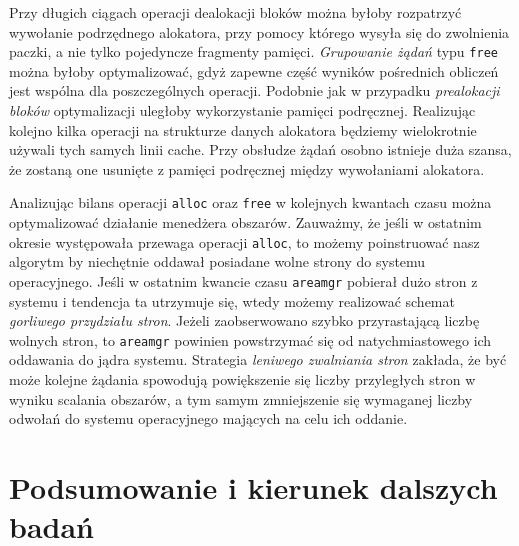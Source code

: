 \documentclass[12pt,a4paper,titlepage,twoside]{mwart}
\begin{document}
Przy długich ciągach operacji dealokacji bloków można byłoby rozpatrzyć
wywołanie podrzędnego alokatora, przy pomocy którego wysyła się do zwolnienia
paczki, a nie tylko pojedyncze fragmenty pamięci. \textit{Grupowanie żądań}
typu \texttt{free} można byłoby optymalizować, gdyż zapewne część wyników
pośrednich obliczeń jest wspólna dla poszczególnych operacji. Podobnie jak w
przypadku \textit{prealokacji bloków} optymalizacji uległoby wykorzystanie
pamięci podręcznej. Realizując kolejno kilka operacji na strukturze danych
alokatora będziemy wielokrotnie używali tych samych linii cache. Przy obsłudze
żądań osobno istnieje duża szansa, że zostaną one usunięte z pamięci podręcznej
między wywołaniami alokatora.

Analizując bilans operacji \texttt{alloc} oraz \texttt{free} w kolejnych
kwantach czasu można optymalizować działanie menedżera obszarów.  Zauważmy, że
jeśli w ostatnim okresie występowała przewaga operacji \texttt{alloc}, to
możemy poinstruować nasz algorytm by niechętnie oddawał posiadane wolne strony
do systemu operacyjnego. Jeśli w ostatnim kwancie czasu \texttt{areamgr}
pobierał dużo stron z systemu i tendencja ta utrzymuje się, wtedy możemy
realizować schemat \textit{gorliwego przydziału stron}.  Jeżeli zaobserwowano
szybko przyrastającą liczbę wolnych stron, to \texttt{areamgr} powinien
powstrzymać się od natychmiastowego ich oddawania do jądra systemu. Strategia
\textit{leniwego zwalniania stron} zakłada, że być może kolejne żądania
spowodują powiększenie się liczby przyległych stron w wyniku scalania obszarów,
a tym samym zmniejszenie się wymaganej liczby odwołań do systemu operacyjnego
mających na celu ich oddanie.

\newpage


\section{Podsumowanie i kierunek dalszych badań}
\hypertarget{Podsumowanie}{}
\end{document}
